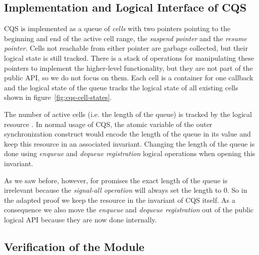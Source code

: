 

\subsection{Implementation and Logical Interface of CQS}
\label{sec:cqs-impl}


CQS is implemented as a queue of \emph{cells} with two pointers pointing to the beginning and end of the active cell range, the \emph{suspend pointer} and the \emph{resume pointer}.
Cells not reachable from either pointer are garbage collected, but their logical state is still tracked.
There is a stack of operations for manipulating these pointers to implement the higher-level functionality, but they are not part of the public API, so we do not focus on them.
Each cell is a container for one callback and the logical state of the queue tracks the logical state of all existing cells shown in figure~\ref{fig:cqs-cell-states}.

The number of active cells  (i.e. the length of the queue) is tracked by the logical resource .
In normal usage of CQS, the atomic variable of the outer synchronization construct would encode the length of the queue in its value and keep this resource in an associated invariant.
Changing the length of the queue is done using \emph{enqueue} and \emph{dequeue registration} logical operations when opening this invariant.

As we saw before, however, for promises the exact length of the queue is irrelevant because the \emph{signal-all operation} will always set the length to 0.
So in the adapted proof we keep the  resource in the invariant of CQS itself.
As a consequence we also move the \emph{enqueue} and \emph{dequeue registration} out of the public logical API because they are now done internally.

\subsection{Verification of the  Module}
\label{sec:cqs-spec}


